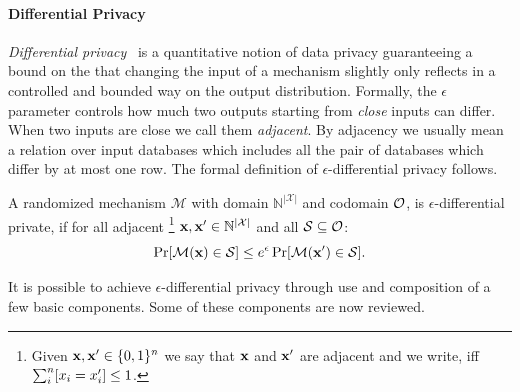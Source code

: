 \documentclass{article}
\begin{document}
\paragraph{Differential Privacy}
%
%
\emph{Differential privacy}~\cite{dwork2006} is a quantitative notion
of data privacy guaranteeing  a bound on the that changing the input of a mechanism slightly only reflects
in a controlled and bounded way on the output distribution. 
Formally, the $\epsilon$ parameter
controls how much two outputs starting from \emph{close} inputs can differ. When two inputs are close we call them \emph{adjacent}.
By adjacency we usually mean a relation over input databases which includes all the pair of databases which differ by at most one row.
The formal definition of $\epsilon$-differential privacy follows.
\begin{definition}
\label{def_epsilon_dp}

A randomized mechanism $\mathcal{M}$ with domain $\mathbb{N}^{|\mathcal{X}|}$ and codomain $\mathcal{O}$, is $\epsilon$-differential private, if for all adjacent
\footnote{Given $\textbf{x}, \textbf{x}'\in\{0,1\}^n$  we say that $\textbf{x}$ and $\textbf{x}'$ are adjacent and we write, iff
$\sum_{i}^{n}[x_i = x'_i ]\leq 1$. } $\textbf{x}, \textbf{x}' \in \mathbb{N}^{|\mathcal{X}|}$ and all $\mathcal{S} \subseteq \mathcal{O}$:
\begin{equation*}
\Pr[\mathcal{M}(\textbf{x}) \in \mathcal{S}] \leq e^\epsilon \Pr[\mathcal{M}(\textbf{x}') \in \mathcal{S}].
\end{equation*}

\end{definition}


It is possible to achieve $\epsilon$-differential privacy through use and composition of
a few basic components. Some of these components are now reviewed.
%
%
\end{document}
